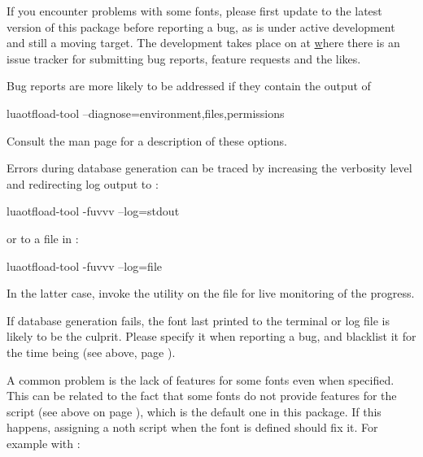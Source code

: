 \endsubsubsection

\endsubsection
\endsection



If you encounter problems with some fonts, please first update to the
latest version of this package before reporting a bug, as
 is under active development and still a moving
target.
%
The development takes place on  at
\hyperlink {https://github.com/lualatex/luaotfload} where there is an issue
tracker for submitting bug reports, feature requests and the likes.

Bug reports are more likely to be addressed if they contain the output
of

\beginlisting
    luaotfload-tool --diagnose=environment,files,permissions
\endlisting

\noindent Consult the man page for a description of these options.

Errors during database generation can be traced by increasing the
verbosity level and redirecting log output to :

\beginlisting
    luaotfload-tool -fuvvv --log=stdout
\endlisting

\noindent or to a file in :

\beginlisting
    luaotfload-tool -fuvvv --log=file
\endlisting

\noindent In the latter case, invoke the  utility on the
file for live monitoring of the progress.

If database generation fails, the font last printed to the terminal or
log file is likely to be the culprit.
%
Please specify it when reporting a bug, and blacklist it for the time
being (see above, page \pageref{font-blacklist}).

\endsubsection


A common problem is the lack of features for some
\OpenType fonts even when specified.
%
This can be related to the fact that some fonts do not provide features
for the  script (see above on page \pageref{script-tag}),
which is the default one in this package.
%
If this happens, assigning a noth script when the font is defined should
fix it.
%
For example with :

